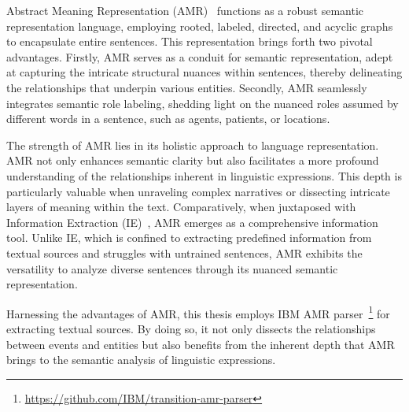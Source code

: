 Abstract Meaning Representation (AMR)~\cite{garg2018stochastic, ballesteros2017amr, lyu2018amr} functions as a robust semantic representation language, employing rooted, labeled, directed, and acyclic graphs to encapsulate entire sentences. This representation brings forth two pivotal advantages. Firstly, AMR serves as a conduit for semantic representation, adept at capturing the intricate structural nuances within sentences, thereby delineating the relationships that underpin various entities. Secondly, AMR seamlessly integrates semantic role labeling, shedding light on the nuanced roles assumed by different words in a sentence, such as agents, patients, or locations.

The strength of AMR lies in its holistic approach to language representation. AMR not only enhances semantic clarity but also facilitates a more profound understanding of the relationships inherent in linguistic expressions. This depth is particularly valuable when unraveling complex narratives or dissecting intricate layers of meaning within the text. Comparatively, when juxtaposed with Information Extraction (IE)~\cite{zheng2023survey, 10221008}, AMR emerges as a comprehensive information tool. Unlike IE, which is confined to extracting predefined information from textual sources and struggles with untrained sentences, AMR exhibits the versatility to analyze diverse sentences through its nuanced semantic representation.

Harnessing the advantages of AMR, this thesis employs IBM AMR parser~\footnote{\url{https://github.com/IBM/transition-amr-parser}} for extracting textual sources. By doing so, it not only dissects the relationships between events and entities but also benefits from the inherent depth that AMR brings to the semantic analysis of linguistic expressions. 
